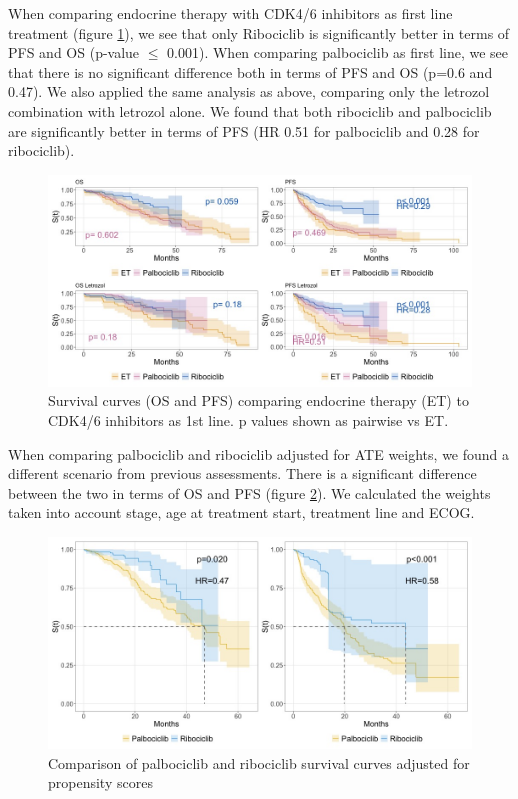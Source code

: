 When comparing endocrine therapy with CDK4/6 inhibitors as first line treatment (figure \ref*{fig:grouped}), we see that only Ribociclib is significantly better in terms of PFS and OS (p-value $\le$ 0.001). When comparing palbociclib as first line, we see that there is no significant difference both in terms of PFS and OS (p=0.6 and 0.47).
We also applied the same analysis as above, comparing only the letrozol combination with letrozol alone. We found that both ribociclib and palbociclib are significantly better in terms of PFS (HR 0.51 for palbociclib and 0.28 for ribociclib).
\begin{figure}[ht]
  \centering

  \caption{Survival curves (OS and PFS) comparing endocrine therapy (ET) to CDK4/6 inhibitors as 1st line. p values shown as pairwise vs ET. }\label{fig:grouped} 
  \includegraphics[scale=0.42]{figures/grouped_curve_both.jpeg}%

\end{figure}

When comparing palbociclib and ribociclib adjusted for ATE weights, we found a different scenario from previous assessments. There is a significant difference between the two in terms of OS and PFS (figure \ref*{fig:propensity}). We calculated the weights taken into account stage, age at treatment start, treatment line and ECOG.

\begin{figure}[ht]
  \centering

  \caption{Comparison of palbociclib and ribociclib survival curves adjusted for propensity scores  }\label{fig:propensity} 
  \includegraphics[scale=0.42]{figures/propensity_score_both.jpeg}%

\end{figure}

